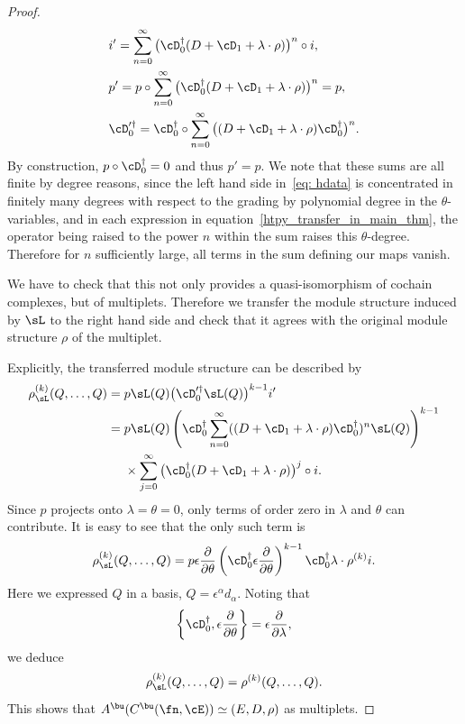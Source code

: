 \begin{proof}
	\begin{align}
	&i' = \sum_{n=0}^{\infty} \big(\cD_0^\dagger(D + \cD_1 + \lambda \cdot \rho)\big)^n \circ i,\nonumber \\
	&p' = p \circ \sum_{n=0}^{\infty} \big(\cD_0^\dagger(D + \cD_1 + \lambda \cdot \rho)\big)^n = p,\nonumber \\
	&\cD_0'^\dagger = \cD_0^\dagger \circ \sum_{n = 0}^{\infty} \big((D + \cD_1 + \lambda \cdot \rho) \cD_0^\dagger\big)^n.	\label{htpy_transfer_in_main_thm}
	\end{align}
	By construction, $p \circ \cD_0^\dagger = 0$ and thus $p' = p$. We note that these sums are all finite by degree reasons, since the left hand side in~\eqref{eq: hdata} is concentrated in finitely many degrees with respect to the grading by polynomial degree in the $\theta$-variables, and in each expression in equation~\eqref{htpy_transfer_in_main_thm}, the operator being raised to the power $n$ within the sum raises this $\theta$-degree. Therefore for $n$ sufficiently large, all terms in the sum defining our maps vanish.
	
	We have to check that this not only provides a quasi-isomorphism of cochain complexes, but of multiplets. Therefore we transfer the module structure induced by $\sL$ to the right hand side and check that it agrees with the original module structure $\rho$ of the multiplet.
	
	Explicitly, the transferred module structure can be described by
	\begin{align*}
	\rho_\sL^{(k)} (Q,\dots,Q)={}& p \sL(Q) \big(\cD_0'^\dagger \sL(Q)\big)^{k-1} i' \\
	={}&p \sL(Q) \left(\cD_0^\dagger \sum_{n = 0}^{\infty} ((D + \cD_1 + \lambda \cdot \rho) \cD_0^\dagger)^n \sL(Q)\right)^{k-1}\\
&{}\times \sum_{j=0}^{\infty} \big(\cD_0^\dagger(D + \cD_1 + \lambda \cdot \rho)\big)^j \circ i .
	\end{align*}
	Since $p$ projects onto $\lambda = \theta = 0$, only terms of order zero in $\lambda$ and $\theta$ can contribute. It is easy to see that the only such term is
	\begin{equation*}
	\rho_\sL^{(k)} (Q,\dots,Q) = p \epsilon \frac{\partial}{\partial \theta} \left(\cD_0^\dagger \epsilon \frac{\partial}{\partial \theta}\right)^{k-1} \cD_0^\dagger \lambda \cdot \rho^{(k)} i .
	\end{equation*}
	Here we expressed $Q$ in a basis, $Q = \epsilon^\alpha d_\alpha$.
	Noting that
	\begin{equation*}
	\left\{\cD_0^\dagger , \epsilon \frac{\partial}{\partial \theta}\right\} = \epsilon \frac{\partial}{\partial \lambda} ,
	\end{equation*}
	we deduce
	\begin{equation*}
	\rho_\sL^{(k)} (Q,\dots,Q) = \rho^{(k)} (Q,\dots,Q) .
	\end{equation*}
	This shows that $A^\bu(C^\bu(\fn , \cE)) \simeq (E,D,\rho)$ as multiplets.
	

\end{proof}
